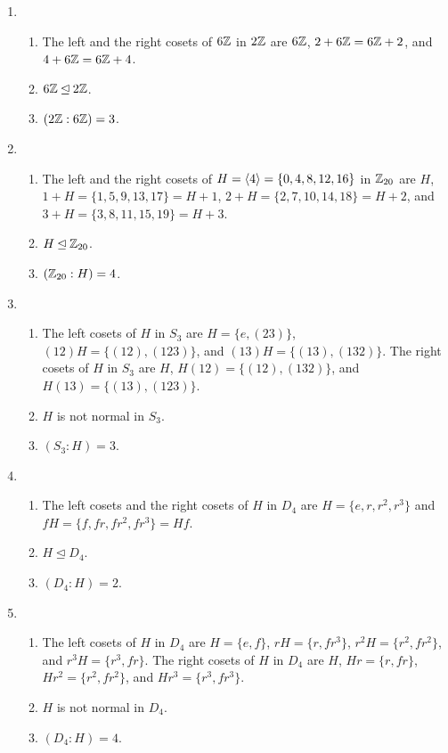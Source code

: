 \begin{solution}[print=true]
\begin{enumerate}
\item
\begin{enumerate} \item The left and the right cosets of $6\mathbb{Z}$ in $2\mathbb{Z}$ are $6\mathbb{Z}$, $2+6\mathbb{Z}=6\mathbb{Z}+2$, and $4+6\mathbb{Z}=6\mathbb{Z}+4$. \item $6\mathbb{Z} \unlhd 2\mathbb{Z}$. \item $(2\mathbb{Z}:6\mathbb{Z})=3$.\end{enumerate}
\item \begin{enumerate} \item The left and the right cosets of $H=\langle4\rangle=\{0,4,8,12,16\}$ in $\mathbb{Z}_{20}$ are $H$, $1+H=\{1,5,9,13,17\}=H+1$, $2+H=\{2,7,10,14,18\}=H+2$, and $3+H=\{3,8,11,15,19\}=H+3$. \item $H \unlhd \mathbb{Z}_{20}$. \item $(\mathbb{Z}_{20}:H)=4$.\end{enumerate}
\item  \begin{enumerate} \item The left cosets of $H$ in $S_3$ are $H=\{e,(23)\}$, $(12)H=\{(12),(123)\}$, and $(13)H=\{(13),(132)\}$. The right cosets of $H$ in $S_3$ are $H$, $H(12)=\{(12),(132)\}$, and $H(13)=\{(13),(123)\}$.   \item $H$ is not normal in $S_3$.  \item $(S_3:H)=3$. \end{enumerate}
\item  \begin{enumerate} \item The left cosets and the right cosets of $H$ in $D_4$ are $H=\{e,r,r^2,r^3\}$ and $fH=\{f,fr, fr^2, fr^3\}=Hf$. \item $H\unlhd D_4$.\item $(D_4:H)=2$. \end{enumerate}
\item \begin{enumerate} \item The left cosets of $H$ in $D_4$ are $H=\{e,f\}$, $rH=\{r,fr^3\}$, $r^2H=\{r^2,fr^2\}$, and $r^3H=\{r^3, fr\}$. The right cosets of $H$ in $D_4$ are $H$, $Hr=\{r, fr\}$, $Hr^2=\{r^2,fr^2\}$, and $Hr^3=\{r^3, fr^3\}$. \item $H$ is not normal in $D_4$.  \item $(D_4:H)=4$. \end{enumerate}
\end{enumerate}
\end{solution}


